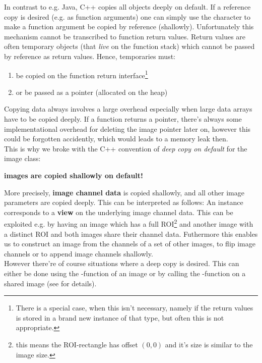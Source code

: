 In contrast to e.g. Java, C++ copies all objects deeply on default. If a reference copy is desired (e.g. as function arguments) one can simply use the \inlinecode{&} character to make a function argument be copied by reference (shallowly). Unfortunately this mechanism cannot be transcribed to function return values. Return values are often temporary objects (that \emph{live} on the function stack) which cannot be passed by reference as return values. Hence, temporaries must:
\begin{enumerate}
\item be copied on the function return interface\footnote{There is a special case, when this isn't necessary, namely if the return values is stored in a brand new instance of that type, but often this is not appropriate.}
\item or be passed as a pointer (allocated on the heap)
\end{enumerate}
Copying data always involves a large overhead especially when large data arrays have to be copied deeply. If a function returns a pointer, there's always some implementational overhead for deleting the image pointer later on, however this could be forgotten accidently, which would leads to a memory leak then.\\
This is why we broke with the C++ convention of \emph{deep copy on default} for the image class:
\begin{center}
\textbf{images are copied shallowly on default!}\\[20pt]
\end{center}
More precisely, \textbf{image channel data} is copied shallowly, and all other image parameters are copied deeply. This can be interpreted as follows:
An  instance corresponds to a \textbf{view} on the underlying image channel data. This can be exploited e.g. by having an image  which has a full ROI\footnote{this means the ROI-rectangle has offset $(0,0)$ and it's size is similar to the image size.} and another image  with a distinct ROI and both images share their channel data. Futhermore this enables us to  construct an image from the channels of a set of other images, to flip image channels or to append image channels shallowly.\\
However there're of course situations where a deep copy is desired. This can either be done using the -function of an image or by calling the -function on a shared image (see  for details).

